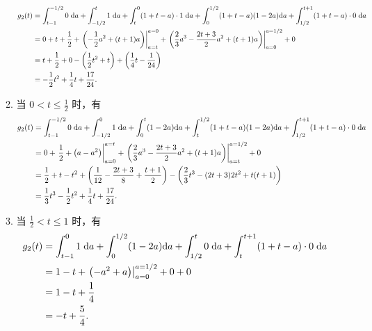 \begin{solution}
\begin{enumerate}[label=(\arabic*)]
\begin{enumerate}
                    \begin{align*}
                        g_2(t) & = \int_{t - 1}^{-1/2}0\;\mathrm{d}a + \int_{-1/2}^{t}1\;\mathrm{d}a + \int_{t}^{0}(1 + t - a)\cdot 1\;\mathrm{d}a + \int_{0}^{1/2}(1 + t - a)(1 - 2a)\mathrm{d}a + \int_{1/2}^{t + 1}(1 + t - a)\cdot 0\;\mathrm{d}a \\
                        & = 0 + t + \frac{1}{2} + \left.\left(-\frac{1}{2}a^2 + (t + 1)a\right)\right|_{a = t}^{a = 0} + \left.\left(\frac{2}{3}a^3 - \frac{2t + 3}{2}a^2 + (t + 1)a\right)\right|_{a = 0}^{a = 1/2} + 0 \\
                        & = t + \frac{1}{2} + 0 - \left(\frac{1}{2}t^2 + t\right) + \left(\frac{1}{4}t - \frac{1}{24}\right) \\
                        & = -\frac{1}{2}t^2 + \frac{1}{4}t + \frac{17}{24}.
                    \end{align*}
                \item 当 $0 < t \le \frac{1}{2}$ 时，有
                    \begin{align*}
                        g_2(t) & = \int_{t - 1}^{-1/2}0\;\mathrm{d}a + \int_{-1/2}^{0}1\;\mathrm{d}a + \int_{0}^{t}(1 - 2a)\mathrm{d}a + \int_{t}^{1/2}(1 + t - a)(1 - 2a)\mathrm{d}a + \int_{1/2}^{t + 1}(1 + t - a)\cdot 0\;\mathrm{d}a \\
                        & = 0 + \left.\frac{1}{2} + \left(a - a^2\right)\right|_{a = 0}^{a = t} + \left.\left(\frac{2}{3}a^3 - \frac{2t + 3}{2}a^2 + (t + 1)a\right)\right|_{a = t}^{a = 1/2} + 0 \\
                        & = \frac{1}{2} + t - t^2 + \left(\frac{1}{12} - \frac{2t + 3}{8} + \frac{t + 1}{2}\right) - \left(\frac{2}{3}t^3 - (2t + 3){2}t^2 + t(t + 1)\right) \\
                        & = \frac{1}{3}t^3 - \frac{1}{2}t^2 + \frac{1}{4}t + \frac{17}{24}.
                    \end{align*}
                \item 当 $\frac{1}{2} < t \le 1$ 时，有
                    \begin{align*}
                        g_2(t) & = \int_{t - 1}^{0}1\;\mathrm{d}a + \int_{0}^{1/2}(1 - 2a)\mathrm{d}a + \int_{1/2}^{t}0\;\mathrm{d}a + \int_{t}^{t + 1}(1 + t - a)\cdot 0\;\mathrm{d}a \\
                        & = 1 - t + \left.\left(-a^2 + a\right)\right|_{a = 0}^{a = 1/2} + 0 + 0 \\
                        & = 1 - t + \frac{1}{4} \\
                        & = -t + \frac{5}{4}.
                    \end{align*}

\end{enumerate}
\end{enumerate}
\end{solution}
